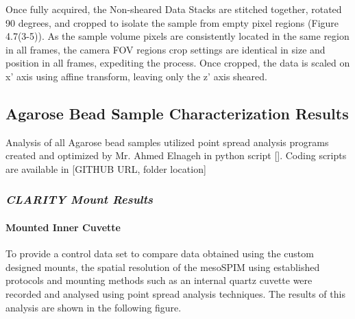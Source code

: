  Once fully acquired, the Non-sheared Data Stacks are stitched together, rotated 90 degrees, and cropped to isolate the sample from empty pixel regions (Figure 4.7(3-5)). As the sample volume pixels are consistently located in the same region in all frames, the camera FOV regions crop settings are identical in size and position in all frames, expediting the process. Once cropped, the data is scaled on x' axis using affine transform, leaving only the z' axis sheared.

\subsection{Agarose Bead Sample Characterization Results}

Analysis of all Agarose bead samples utilized point spread analysis programs created and optimized by Mr. Ahmed Elnageh in python script []. Coding scripts are available in [GITHUB URL, folder location]

\subsubsection{\textit{CLARITY Mount Results}}
\paragraph{Mounted Inner Cuvette}
To provide a control data set to compare data obtained using the custom designed mounts, the spatial resolution of the mesoSPIM using established protocols and mounting methods such as an internal quartz cuvette were recorded and analysed using point spread analysis techniques. The results of this analysis are shown in the following figure.

